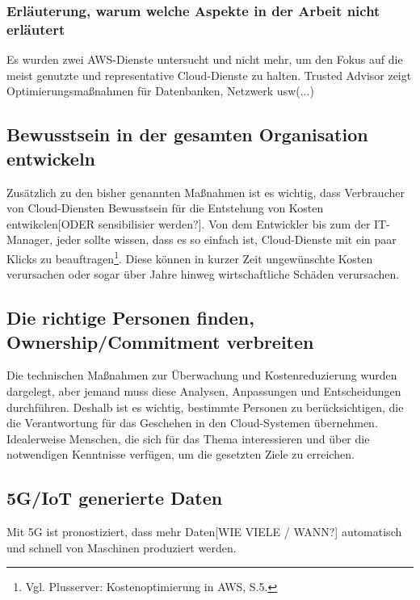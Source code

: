\subsubsection*{Erläuterung, warum welche Aspekte in der Arbeit nicht erläutert} 
Es wurden zwei AWS-Dienste untersucht und nicht mehr, um den Fokus auf die meist genutzte und representative Cloud-Dienste zu halten. Trusted Advisor zeigt Optimierungsmaßnahmen für Datenbanken, Netzwerk usw(...) 

\subsection*{Bewusstsein in der gesamten Organisation entwickeln}
Zusätzlich zu den bisher genannten Maßnahmen ist es wichtig, dass Verbraucher von Cloud-Diensten Bewusstsein für die Entstehung von Kosten entwikclen[ODER sensibilisier werden?]. Von dem Entwickler bis zum der IT-Manager, jeder sollte wissen, dass es so einfach ist, Cloud-Dienste mit ein paar Klicks zu beauftragen\footnote{Vgl. Plusserver: Kostenoptimierung in AWS, S.5\cite{PS1}.}. Diese können in kurzer Zeit ungewünschte  Kosten verursachen oder sogar über Jahre hinweg wirtschaftliche Schäden verursachen. 
\\
\subsection*{Die richtige Personen finden, Ownership/Commitment verbreiten}
Die technischen Maßnahmen zur Überwachung und Kostenreduzierung wurden dargelegt, aber jemand muss diese Analysen, Anpassungen und Entscheidungen durchführen. 
Deshalb ist es wichtig, bestimmte Personen zu berücksichtigen, die die Verantwortung für das Geschehen in den Cloud-Systemen übernehmen. Idealerweise Menschen, die sich für das Thema interessieren und über die notwendigen Kenntnisse verfügen, um die gesetzten Ziele zu erreichen. 
\\
\subsection*{5G/IoT generierte Daten}
Mit 5G ist pronostiziert, dass mehr Daten[WIE VIELE / WANN?] automatisch und schnell von Maschinen produziert werden.
\\
